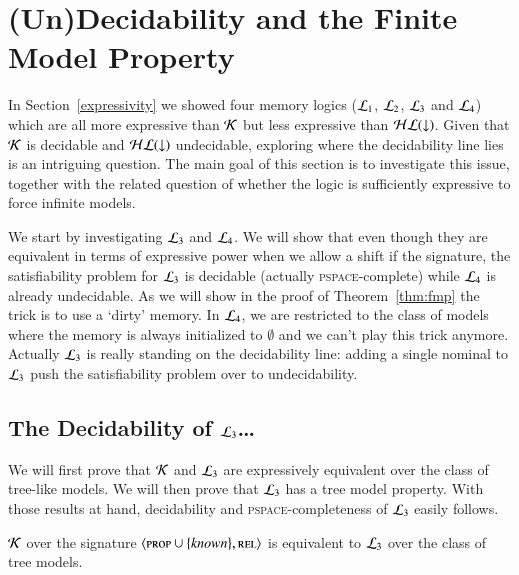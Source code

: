\section{(Un)Decidability and the Finite Model Property}

In Section~\ref{expressivity} we showed four memory logics
($\mathcal{L}_1$, $\mathcal{L}_2$, $\mathcal{L}_3$ and $\mathcal{L}_4$) which are all more
expressive than $\mathcal{K}$ but less expressive than $\mathcal{HL}({\downarrow})$. Given
that $\mathcal{K}$ is decidable and $\mathcal{HL}({\downarrow})$ undecidable, exploring
where the decidability line lies is an intriguing question.  The
main goal of this section is to investigate this issue, together
with the related question of whether the logic is sufficiently
expressive to force infinite models.

We start by investigating $\mathcal{L}_3$ and $\mathcal{L}_4$. We will show
that even though they are equivalent in terms of expressive power
when we allow a shift if the signature, the satisfiability problem
for $\mathcal{L}_3$ is decidable (actually \textsc{pspace}-complete) while
$\mathcal{L}_4$ is already undecidable. As we will show in the proof of
Theorem~\ref{thm:fmp} the trick is to use a `dirty' memory. In
$\mathcal{L}_4$, we are restricted to the class of models where the
memory is always initialized to $\emptyset$ and we can't play this
trick anymore.  Actually $\mathcal{L}_3$ is really standing on the
decidability line: adding a single nominal to $\mathcal{L}_3$ push the
satisfiability problem over to undecidability.

\subsection{The Decidability of $\mathcal{L}_3$\ldots}

We will first prove that $\mathcal{K}$ and $\mathcal{L}_3$ are expressively
equivalent over the class of tree-like models.
We will then prove that $\mathcal{L}_3$ has a tree model property.
With those results at hand, decidability and \textsc{pspace}-completeness
of $\mathcal{L}_3$ easily follows.

\begin{thm}\label{prop:sat-preserv-tree}
$\mathcal{K}$  over the signature $\langle \textsc{prop} \cup \{\mathit{known}\},\textsc{rel} \rangle$
is equivalent to $\mathcal{L}_3$ over the class of tree models.
\end{thm}

